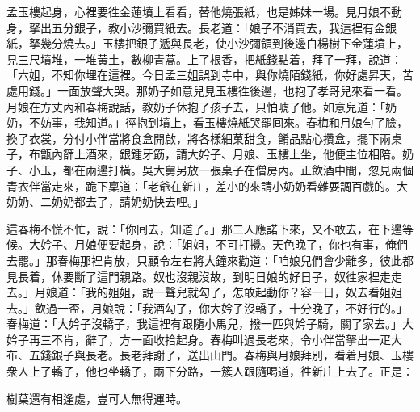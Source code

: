 孟玉樓起身，心裡要徃金蓮墳上看看，替他燒張紙，也是姊妹一場。見月娘不動身，{}拏出五分銀子，教小沙彌買紙去。長老道：「娘子不消買去，我這裡有金銀紙，拏幾分燒去。」玉樓把銀子遞與長老，使小沙彌領到後邊白楊樹下金蓮墳上，見三尺墳堆，一堆黃土，數柳青蒿。{}上了根香，把紙錢點着，拜了一拜，說道：「六姐，不知你埋在這裡。今日孟三姐誤到寺中，與你燒陌錢紙，你好處昇天，苦處用錢。」一面放聲大哭。那奶子如意兒見玉樓徃後邊，也抱了孝哥兒來看一看。月娘在方丈內和春梅說話，教奶子休抱了孩子去，只怕唬了他。如意兒道：「奶奶，不妨事，我知道。」徑抱到墳上，看玉樓燒紙哭罷囘來。春梅和月娘勻了臉，換了衣裳，分付小伴當將食盒開啟，將各樣細菓甜食，餚品點心攢盒，擺下兩桌子，布甑內篩上酒來，銀鍾牙筯，請大妗子、月娘、玉樓上坐，他便主位相陪。奶子、小玉，都在兩邊打橫。吳大舅另放一張桌子在僧房內。正飲酒中間，忽見兩個青衣伴當走來，跪下稟道：「老爺在新庄，差小的來請小奶奶看雜耍調百戲的。大奶奶、二奶奶都去了，請奶奶快去哩。」

這春梅不慌不忙，{}說：「你囘去，知道了。」那二人應諾下來，又不敢去，在下邊等候。大妗子、月娘便要起身，說：「姐姐，不可打攪。天色晚了，你也有事，俺們去罷。」那春梅那裡肯放，只顧令左右將大鐘來勸道：「咱娘兒們會少離多，彼此都見長着，休要斷了這門親路。奴也沒親沒故，到明日娘的好日子，奴徃家裡走走去。」月娘道：「我的姐姐，說一聲兒就勾了，怎敢起動你？容一日，奴去看姐姐去。」{}飲過一盃，月娘說：「我酒勾了，你大妗子沒轎子，十分晚了，不好行的。」春梅道：「大妗子沒轎子，我這裡有跟隨小馬兒，撥一匹與妗子騎，關了家去。」大妗子再三不肯，辭了，方一面收拾起身。春梅叫過長老來，令小伴當拏出一疋大布、五錢銀子與長老。長老拜謝了，送出山門。春梅與月娘拜別，看着月娘、玉樓衆人上了轎子，他也坐轎子，兩下分路，一簇人跟隨喝道，徃新庄上去了。正是：

\begin{myquote}
樹葉還有相逢處，豈可人無得運時。
\end{myquote}

